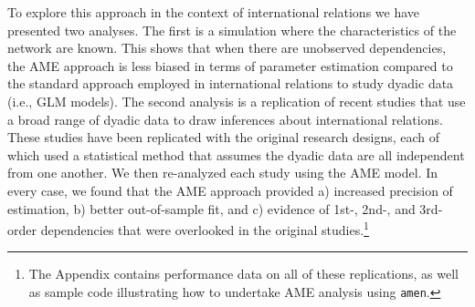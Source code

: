 To explore this approach in the context of international relations we have presented two analyses. The first is a simulation where the characteristics of the network are known. This shows that when there are unobserved dependencies, the AME approach is less biased in terms of parameter estimation compared to the standard approach employed in international relations to study dyadic data (i.e., GLM models). The second analysis is a replication of recent studies that use a broad range of dyadic data to draw inferences about international relations.  These studies have been replicated with the original research designs, each of which used a statistical method that assumes the dyadic data are all independent from one another.  We then re-analyzed each study using the AME model.  In every case, we found that the AME approach provided a) increased precision of estimation, b) better out-of-sample fit, and c) evidence of 1st-, 2nd-, and 3rd-order dependencies that were overlooked in the original studies.\footnote{The Appendix contains performance data on all of these replications, as well as sample code illustrating how to undertake AME analysis using \texttt{amen}.}

